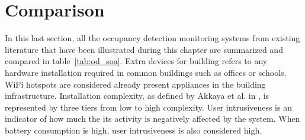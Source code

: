
\section{Comparison}
\label{sec:comparison}

In this last section, all the occupancy detection monitoring systems from existing literature that have been illustrated during this chapter are summarized and compared in table~\ref{tab:od_soa}. Extra devices for building refers to any hardware installation required in common buildings such as offices or schools. WiFi hotspots are considered already present appliances in the building infrastructure. Installation complexity, as defined by Akkaya et al. in \cite{Akkaya2015}, is represented by three tiers from low to high complexity. User intrusiveness is an indicator of how much the its activity is negatively affected by the system. When battery consumption is high, user intrusiveness is also considered high.

